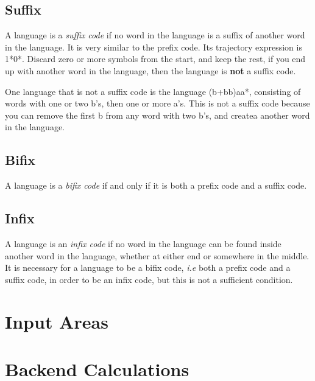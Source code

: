\documentclass{article}
\begin{document}
\subsection{Suffix}
A language is a \textit{suffix code} if no word in the language is a suffix of another word in the language. It is very similar to the prefix code. Its trajectory expression is 1*0*. Discard zero or more symbols from the start, and keep the rest, if you end up with another word in the language, then the language is \textbf{not} a suffix code. 

\par One language that is not a suffix code is the language (b+bb)aa*, consisting of words with one or two b's, then one or more a's. This is not a suffix code because you can remove the first b from any word with two b's, and createa another word in the language. 

\subsection{Bifix}
A language is a \textit{bifix code} if and only if it is both a prefix code and a suffix code. 

\subsection{Infix}
A language is an \textit{infix code} if no word in the language can be found inside another word in the language, whether at either end or somewhere in the middle. It is necessary for a language to be a bifix code, \textit{i.e} both a prefix code and a suffix code, in order to be an infix code, but this is not a sufficient condition. 
\section{Input Areas}

\section{Backend Calculations}
\end{document}
